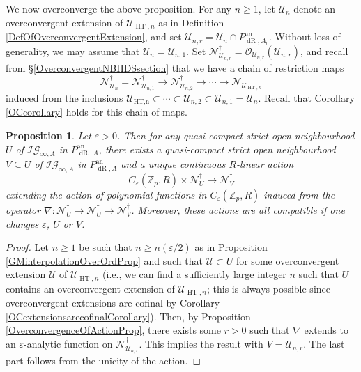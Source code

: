 \documentclass[10pt, oneside]{amsart}
\numberwithin{equation}{subsection}
\newtheorem{proposition}[equation]{Proposition}
\theoremstyle{definition}
\theoremstyle{remark}
\newcommand{\mbb}[1]{\mathbb{#1}}
\newcommand{\opn}[1]{\operatorname{#1}}
\def\epsilon{\varepsilon}
\begin{document}
We now overconverge the above proposition. For any $n \geq 1$, let $\mathcal{U}_n$ denote an overconvergent extension of $\mathcal{U}_{\opn{HT}, n}$ as in Definition \ref{DefOfOverconvergentExtension}, and set $\mathcal{U}_{n, r} = \mathcal{U}_n \cap P_{\opn{dR}, A_r}^{\opn{an}}$. Without loss of generality, we may assume that $\mathcal{U}_n = \mathcal{U}_{n, 1}$. Set $\mathscr{N}^{\dagger}_{\mathcal{U}_{n,r}} = \mathcal{O}_{\mathcal{U}_{n,r}}(\mathcal{U}_{n, r})$, and recall from \S \ref{OverconvergentNBHDSsection} that we have a chain of restriction maps 
\begin{equation} \label{ChainOfNdaggerOC}
\mathscr{N}^{\dagger}_{\mathcal{U}_n} = \mathscr{N}^{\dagger}_{\mathcal{U}_{n,1}} \to \mathscr{N}^{\dagger}_{\mathcal{U}_{n,2}} \to \cdots \to \mathscr{N}_{\mathcal{U}_{\opn{HT}, n}}
\end{equation}
induced from the inclusions $\mathcal{U}_{\opn{HT, n}} \subset \cdots \subset \mathcal{U}_{n, 2} \subset \mathcal{U}_{n, 1} = \mathcal{U}_n$. Recall that Corollary \ref{OCcorollary} holds for this chain of maps.

\begin{proposition} \label{GeneralUVepsilonaction}
Let $\varepsilon > 0$. Then for any quasi-compact strict open neighbourhood $U$ of $\mathcal{IG}_{\infty, A}$ in $P_{\opn{dR}, A}^{\opn{an}}$, there exists a quasi-compact strict open neighbourhood $V \subseteq U$ of $\mathcal{IG}_{\infty, A}$ in $P_{\opn{dR}, A}^{\opn{an}}$ and a unique continuous $R$-linear action 
    \[
    C_{\varepsilon}(\mbb{Z}_p, R) \times \mathscr{N}^{\dagger}_{U} \to \mathscr{N}^{\dagger}_{V} 
    \]
    extending the action of polynomial functions in $C_{\varepsilon}(\mbb{Z}_p, R)$ induced from the operator $\nabla \colon \mathscr{N}^{\dagger}_{U} \to \mathscr{N}^{\dagger}_{U} \to \mathscr{N}^{\dagger}_{V}$. Moreover, these actions are all compatible if one changes $\varepsilon$, $U$ or $V$.
\end{proposition}
\begin{proof}
Let $n \geq 1$ be such that $n \geq n(\epsilon / 2)$ as in Proposition \ref{GMinterpolationOverOrdProp} and such that $\mathcal{U} \subset U$ for some overconvergent extension $\mathcal{U}$ of $\mathcal{U}_{\opn{HT}, n}$ (i.e., we can find a sufficiently large integer $n$ such that $U$ contains an overconvergent extension of $\mathcal{U}_{\opn{HT}, n}$; this is always possible since overconvergent extensions are cofinal by Corollary \ref{OCextensionsarecofinalCorollary}). Then, by Proposition \ref{OverconvergenceOfActionProp}, there exists some $r>0$ such that $\nabla$ extends to an $\epsilon$-analytic function on $\mathscr{N}^\dagger_{\mathcal{U}_{n, r}}$. This implies the result with $V = \mathcal{U}_{n, r}$. The last part follows from the unicity of the action.
\end{proof}
\end{document}

